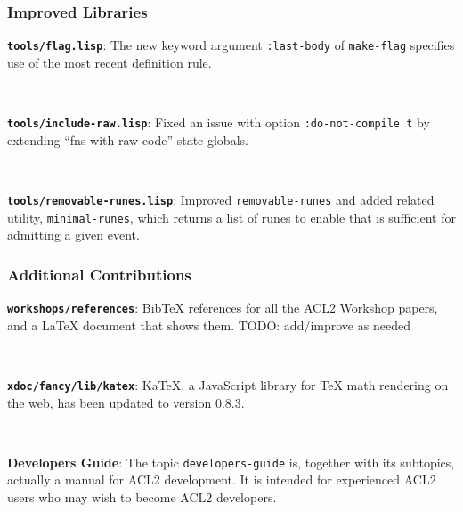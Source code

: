 \documentclass{beamer}
\newcommand{\code}[1]{\texttt{#1}}
\newcommand{\bookpath}[1]{\textbf{\code{#1}}}
\newcommand{\implibtitle}{\frametitle{Improved Libraries}}
\begin{document}

\begin{frame}

\implibtitle

\bookpath{tools/flag.lisp}:
The new keyword argument \code{:last-body} of \code{make-flag}
specifies use of the most recent definition rule.

\

\bookpath{tools/include-raw.lisp}:
Fixed an issue with option \code{:do-not-compile t} by extending
``fns-with-raw-code'' state globals.

\

\bookpath{tools/removable-runes.lisp}:
Improved \code{removable-runes} and added related utility,
\code{minimal-runes}, which returns a list of runes to enable that is
sufficient for admitting a given event.

\end{frame}


\begin{frame}

\frametitle{Additional Contributions}

\bookpath{workshops/references}:
BibTeX references for all the ACL2 Workshop papers,
and a LaTeX document that shows them.
TODO: add/improve as needed

\

\bookpath{xdoc/fancy/lib/katex}:
KaTeX, a JavaScript library for TeX math rendering on the web,
has been updated to version 0.8.3.

\

\textbf{Developers Guide}:
The topic \code{developers-guide} is, together with its subtopics, actually a
manual for ACL2 development.  It is intended for experienced ACL2
users who may wish to become ACL2 developers.

\end{frame}

\end{document}
